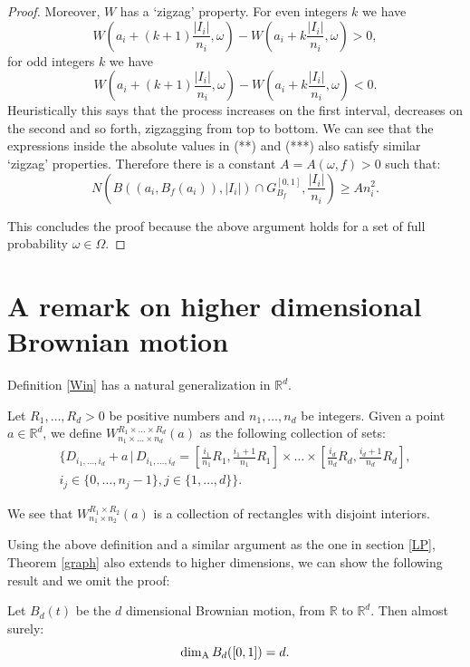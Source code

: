 \begin{proof}
	Moreover, $W$ has a `zigzag' property. For even integers $k$ we have
	\[
	W\left(a_i+(k+1)\frac{|I_i|}{n_i},\omega\right)-W\left(a_i+k\frac{|I_i|}{n_i},\omega\right)>0,
	\] 
	for odd integers $k$ we have
	\[
	W\left(a_i+(k+1)\frac{|I_i|}{n_i},\omega\right)-W\left(a_i+k\frac{|I_i|}{n_i},\omega\right)<0.
	\]  
	Heuristically this says that the process increases on the first interval, decreases on the second and so forth, zigzagging from top to bottom. We can see that the expressions inside the absolute values in (**) and (***) also satisfy similar `zigzag' properties. Therefore there is a constant $A=A(\omega,f)>0$ such that:
	\[
	N\left(B\left(\left(a_i,B_f(a_i)\right),|I_i|\right)\cap G_{B_f}^{[0,1]},\frac{|I_i|}{n_i}\right)\geq A n_i^2.
	\] 
	
	This concludes the proof because the above argument holds for a set of full probability $\omega\in\Omega$.
\end{proof}



\section{A remark on higher dimensional Brownian motion}

Definition \ref{Win} has a natural generalization in $\mathbb{R}^d$.
\begin{defn}\label{Win2}
	Let $R_1,\dots,R_d>0$ be positive numbers and $n_1,\dots, n_d$ be integers. Given a point $a\in\mathbb{R}^d$, we define $W_{n_1\times\dots\times n_d}^{R_1\times\dots\times R_d}(a)$ as the following collection of sets:
	\begin{eqnarray*}
		\Bigg\{D_{i_1,\dots,i_d}+a \, \vert \, D_{i_1,\dots,i_d}=\left[\frac{i_1}{n_1}R_1,\frac{i_1+1}{n_1}R_1\right]\times\dots\times \left[\frac{i_d}{n_d}R_d,\frac{i_d+1}{n_d}R_d\right],\\ i_j\in\{0,\dots,n_j-1\}, j\in\{1,\dots,d\}\Bigg\}.
	\end{eqnarray*}
	
	We see that $W_{n_1\times n_2}^{R_1\times R_2}(a)$ is a collection of rectangles with disjoint interiors.
\end{defn}

Using the above definition and a similar argument as the one in section \ref{LP},  Theorem \ref{graph} also extends to higher dimensions, we can show the following result and we omit the proof:

\begin{thm}
	Let $B_d(t)$ be the $d$ dimensional Brownian motion, from $\mathbb{R}$ to $\mathbb{R}^d$. Then almost surely:
	\[
	\dim_{\mathrm{A}} B_d([0,1])=d.
	\]
\end{thm}

